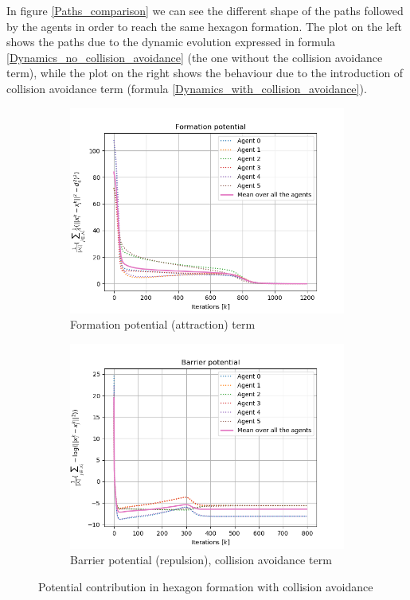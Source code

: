 \documentclass[a4paper,11pt,oneside]{book}
\begin{document}
In figure \ref{Paths_comparison} we can see the different shape of the paths followed by the agents in order to reach the same hexagon formation. The plot on the left shows the paths due to the dynamic evolution expressed in formula \ref{Dynamics_no_collision_avoidance} (the one without the collision avoidance term), while the plot on the right shows the behaviour due to the introduction of collision avoidance term (formula \ref{Dynamics_with_collision_avoidance}).

\begin{figure}[h]
\centering
	\begin{subfigure}{0.49\textwidth}	
	\includegraphics[scale=0.42]{Task-2.2_Formation-p_Yes-Coll-Avoid_Hexagon}
	\caption{Formation potential (attraction) term}
	\end{subfigure}
\hfill
	\begin{subfigure}{0.49\textwidth}	
	\includegraphics[scale=0.42]{Barrier_potential_hexagon_collision.png}
	\caption{Barrier potential (repulsion), collision avoidance term}
	\end{subfigure}
\caption{Potential contribution in hexagon formation with collision avoidance}
\label{Potentials_with_collision}
\end{figure}
\end{document}
